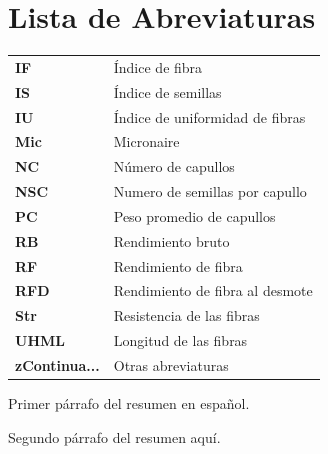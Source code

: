 \documentclass[12pt,oneside]{reedthesis}
\begin{document}
\chapter*{Lista de Abreviaturas}
\begin{table}[h]
    \centering
    \begin{tabular}{ll}
                \textbf{IF} & Índice de fibra \\
                \textbf{IS} & Índice de semillas \\
                \textbf{IU} & Índice de uniformidad de fibras \\
                \textbf{Mic} & Micronaire \\
                \textbf{NC} & Número de capullos \\
                \textbf{NSC} & Numero de semillas por capullo \\
                \textbf{PC} & Peso promedio de capullos \\
                \textbf{RB} & Rendimiento bruto \\
                \textbf{RF} & Rendimiento de fibra \\
                \textbf{RFD} & Rendimiento de fibra al desmote \\
                \textbf{Str} & Resistencia de las fibras \\
                \textbf{UHML} & Longitud de las fibras \\
                \textbf{zContinua...} & Otras abreviaturas \\
            \end{tabular}
\end{table}
\thispagestyle{fancy} %
    \fancyhf{} %
    \fancyhead{} %
    \fancyfoot[R]{\thepage} %

  \begin{resumen}
    Primer párrafo del resumen en español.

    \par

    Segundo párrafo del resumen aquí.
    \thispagestyle{fancy} %
    \fancyhf{} %
    \fancyhead{} %
    \fancyfoot[R]{\thepage} %
  \end{resumen}
\end{document}
